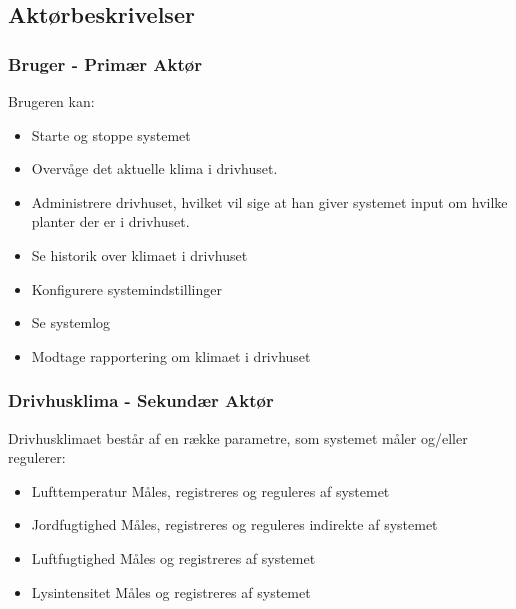 \subsection{Aktørbeskrivelser}

\subsubsection{Bruger - Primær Aktør}
Brugeren kan:
\begin{itemize}
\item Starte og stoppe systemet 
\item Overvåge det aktuelle klima i drivhuset. 
\item Administrere drivhuset, hvilket vil sige at han giver systemet input om hvilke planter der er i drivhuset. 
\item Se historik over klimaet i drivhuset
\item Konfigurere systemindstillinger
\item Se systemlog
\item Modtage rapportering om klimaet i drivhuset 
\end{itemize}

\subsubsection{Drivhusklima - Sekundær Aktør}
Drivhusklimaet består af en række parametre, som systemet måler og/eller regulerer:
\begin{itemize}
\item Lufttemperatur
	\subitem Måles, registreres og reguleres af systemet
\item Jordfugtighed
	\subitem Måles, registreres og reguleres indirekte af systemet
\item Luftfugtighed
	\subitem Måles og registreres af systemet
\item Lysintensitet
	\subitem Måles og registreres af systemet
\end{itemize}

